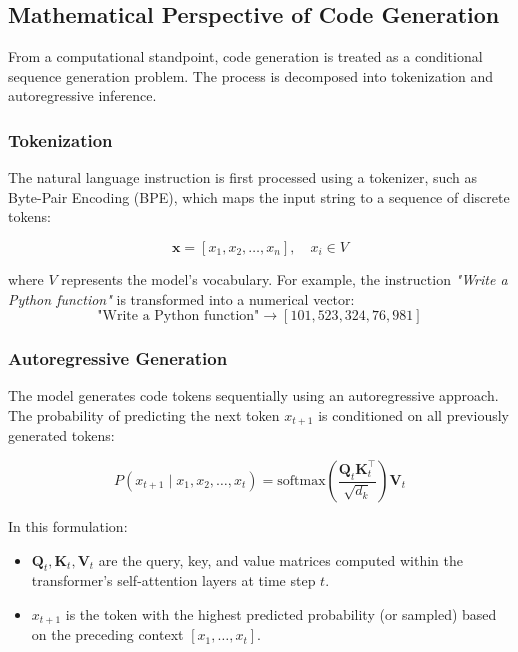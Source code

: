 \subsection{Mathematical Perspective of Code Generation}
From a computational standpoint, code generation is treated as a conditional sequence generation problem. The process is decomposed into tokenization and autoregressive inference.

\subsubsection{Tokenization}
The natural language instruction is first processed using a tokenizer, such as Byte-Pair Encoding (BPE), which maps the input string to a sequence of discrete tokens:

\begin{equation}
\mathbf{x} = [x_1, x_2, \dots, x_n], \quad x_i \in V
\end{equation}

where $V$ represents the model's vocabulary. For example, the instruction \textit{"Write a Python function"} is transformed into a numerical vector:
\begin{equation}
\text{"Write a Python function"} \longrightarrow [101, 523, 324, 76, 981]
\end{equation}

\subsubsection{Autoregressive Generation}
The model generates code tokens sequentially using an autoregressive approach. The probability of predicting the next token $x_{t+1}$ is conditioned on all previously generated tokens:



\begin{equation}
P(x_{t+1} \mid x_1, x_2, \dots, x_t) = \text{softmax}\left(\frac{\mathbf{Q}_t \mathbf{K}_t^\top}{\sqrt{d_k}} \right) \mathbf{V}_t
\end{equation}

In this formulation:
\begin{itemize}
    \item $\mathbf{Q}_t, \mathbf{K}_t, \mathbf{V}_t$ are the query, key, and value matrices computed within the transformer's self-attention layers at time step $t$.
    \item $x_{t+1}$ is the token with the highest predicted probability (or sampled) based on the preceding context $[x_1, \dots, x_t]$.
\end{itemize}


